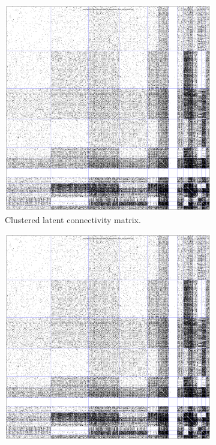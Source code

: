 \documentclass{article}
\begin{document}
\begin{figure}
  \centering 
  \begin{subfigure}[b]{0.46\textwidth}
    \includegraphics[width=\textwidth, page=1]{mouseretina/retina.1.0.ld.0.0.data-fixed_20_100-anneal_slow_400.0.latent.pdf}
    \caption{Clustered latent connectivity matrix.}
    \label{fig:gull}
  \end{subfigure}
  \begin{subfigure}[b]{0.46\textwidth}
    \includegraphics[width=\textwidth, page=2]{mouseretina/retina.1.0.ld.0.0.data-fixed_20_100-anneal_slow_400.0.latent.pdf}

\end{subfigure}
\end{figure}
\end{document}
